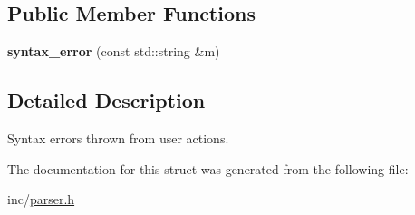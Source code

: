 \subsection*{Public Member Functions}
\begin{DoxyCompactItemize}
\item 
\hypertarget{structyy_1_1parser_1_1syntax__error_a41dabc53a4cf5a413dd1d93d415abc42}{}{\bfseries syntax\+\_\+error} (const std\+::string \&m)\label{structyy_1_1parser_1_1syntax__error_a41dabc53a4cf5a413dd1d93d415abc42}

\end{DoxyCompactItemize}


\subsection{Detailed Description}
Syntax errors thrown from user actions. 

The documentation for this struct was generated from the following file\+:\begin{DoxyCompactItemize}
\item 
inc/\hyperlink{parser_8h}{parser.\+h}\end{DoxyCompactItemize}
